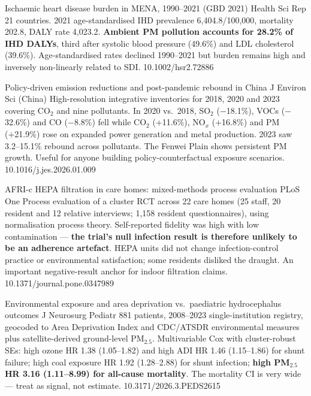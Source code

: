 \documentclass[10pt]{article}
\begin{document}

{Ischaemic heart disease burden in MENA, 1990--2021 (GBD 2021)}
{Health Sci Rep}
{21 countries. 2021 age-standardised IHD prevalence 6{,}404.8/100{,}000, mortality
202.8, DALY rate 4{,}023.2. \textbf{Ambient PM pollution accounts for 28.2\% of IHD
DALYs}, third after systolic blood pressure (49.6\%) and LDL cholesterol (39.6\%).
Age-standardised rates declined 1990--2021 but burden remains high and inversely
non-linearly related to SDI.}
{10.1002/hsr2.72886}

{Policy-driven emission reductions and post-pandemic rebound in China}
{J Environ Sci (China)}
{High-resolution integrative inventories for 2018, 2020 and 2023 covering CO$_2$ and nine
pollutants. In 2020 vs.\ 2018, SO$_2$ ($-$18.1\%), VOCs ($-$32.6\%) and CO ($-$8.8\%) fell
while CO$_2$ (+11.6\%), NO$_x$ (+16.8\%) and PM (+21.9\%) rose on expanded power
generation and metal production. 2023 saw 3.2--15.1\% rebound across pollutants.
The Fenwei Plain shows persistent PM growth. Useful for anyone building
policy-counterfactual exposure scenarios.}
{10.1016/j.jes.2026.01.009}

{AFRI-c HEPA filtration in care homes: mixed-methods process evaluation}
{PLoS One}
{Process evaluation of a cluster RCT across 22 care homes (25 staff, 20 resident and 12
relative interviews; 1{,}158 resident questionnaires), using normalisation process
theory. Self-reported fidelity was high with low contamination --- \textbf{the trial's null
infection result is therefore unlikely to be an adherence artefact}. HEPA units did not
change infection-control practice or environmental satisfaction; some residents disliked
the draught. An important negative-result anchor for indoor filtration claims.}
{10.1371/journal.pone.0347989}


{Environmental exposure and area deprivation vs.\ paediatric hydrocephalus outcomes}
{J Neurosurg Pediatr}
{881 patients, 2008--2023 single-institution registry, geocoded to Area Deprivation Index
and CDC/ATSDR environmental measures plus satellite-derived ground-level PM$_{2.5}$.
Multivariable Cox with cluster-robust SEs: high ozone HR 1.38 (1.05--1.82) and high ADI
HR 1.46 (1.15--1.86) for shunt failure; high coal exposure HR 1.92 (1.28--2.88) for shunt
infection; \textbf{high PM$_{2.5}$ HR 3.16 (1.11--8.99) for all-cause mortality}.
The mortality CI is very wide --- treat as signal, not estimate.}
{10.3171/2026.3.PEDS2615}
\end{document}
